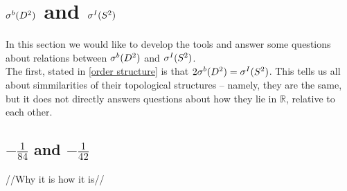 \section{${\mathcal{\sigma}^b(D^2)}$ and ${\mathcal{\sigma}^I(S^2)}$}
In this section we would like to develop the tools and answer some questions about 
relations between ${\mathcal{\sigma}^b(D^2)}$ and ${\mathcal{\sigma}^I(S^2)}$. \\
The first, stated in \ref{order structure} is that $2{\mathcal{\sigma}^b(D^2)}={\mathcal{\sigma}^I(S^2)}$. 
This tells us all about simmilarities of their topological structures -- namely, they are the same, 
but it does not directly answers questions about how they lie in $\mathbb{R}$, relative 
to each other. 
\subsection{$-\frac{1}{84}$ and $-\frac{1}{42}$}
//Why it is how it is//
